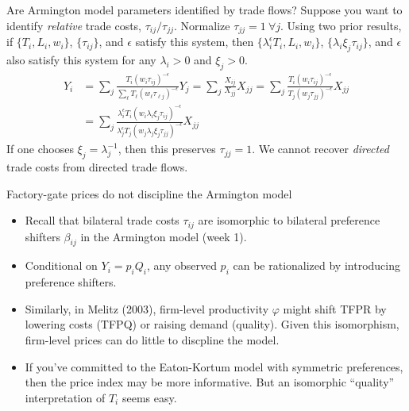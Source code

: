 \documentclass[11pt,notes=hide,aspectratio=169]{beamer}
\begin{document}
\begin{frame}{Are  Armington model parameters identified by trade flows?}
Suppose you want to identify \textit{relative} trade costs, $\tau_{ij} / \tau_{jj}$.
Normalize $\tau_{jj} = 1 \ \forall j$.
\medskip
Using two prior results,
if $\{T_i,L_i,w_i\}$, $\{\tau_{ij}\}$, and $\epsilon$ satisfy this system,
then
$\{\lambda_i^{\epsilon} T_i,L_i,w_i\}$, $\{\lambda_i \xi_j \tau_{ij}\}$, and $\epsilon$
also satisfy this system
for any $\lambda_{i} > 0$ and $\xi_j > 0$.
\begin{align*}
Y_i
&=
\sum_j \frac{T_i \left(w_i \tau_{ij}\right)^{-\epsilon}}{\sum_{\ell} T_{\ell} \left(w_{\ell} \tau_{\ell j}\right)^{-\epsilon}}
Y_j
=
\sum_j \frac{X_{ij}}{X_{jj}} 
X_{jj}
=
\sum_j \frac{T_i \left(w_i \tau_{ij}\right)^{-\epsilon}}{T_j \left(w_j \tau_{jj}\right)^{-\epsilon}}
X_{jj}
\\
&=
\sum_j \frac{\lambda_i^{\epsilon}T_i \left(w_i \lambda_i \xi_j\tau_{ij}\right)^{-\epsilon}}{\lambda_j^{\epsilon}T_j \left(w_j \lambda_j \xi_j \tau_{jj}\right)^{-\epsilon}}
X_{jj}
\end{align*}
If one chooses $\xi_j = \lambda^{-1}_j$, then this preserves $\tau_{jj} = 1$.
\medskip
We cannot recover \textit{directed} trade costs from directed trade flows.
\end{frame}
\begin{frame}{Factory-gate prices do not discipline the Armington model}
\begin{itemize}
\item
Recall that bilateral trade costs $\tau_{ij}$ are isomorphic to bilateral preference shifters $\beta_{ij}$ in the Armington model (week 1).
\item
Conditional on $Y_i = p_i Q_i$, any observed $p_i$ can be rationalized by introducing preference shifters.
\item
Similarly, in Melitz (2003), firm-level productivity $\varphi$ might shift TFPR by lowering costs (TFPQ) or raising demand (quality).
Given this isomorphism, firm-level prices can do little to discpline the model.
\item
If you've committed to the Eaton-Kortum model with symmetric preferences,
then the price index may be more informative.
But an isomorphic ``quality'' interpretation of $T_i$ seems easy.
\end{itemize}
\end{frame}
\end{document}
